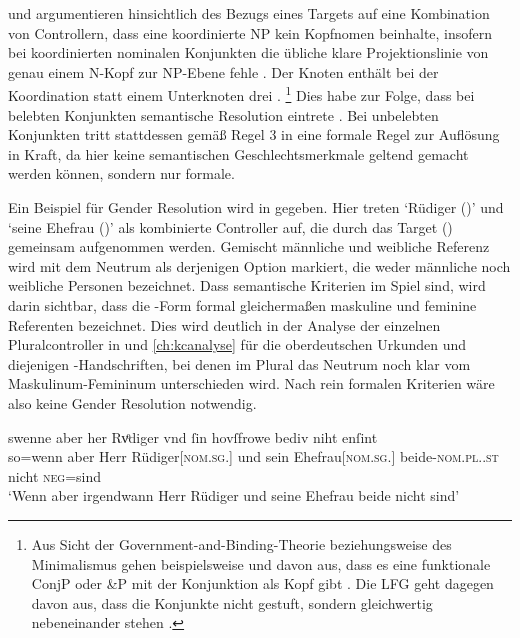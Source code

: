 \citet[182--183]{wechslerzlatic2003} und \citet[576]{wechsler2009}
argumentieren hinsichtlich des Bezugs eines Targets auf eine Kombination von
Controllern, dass eine koordinierte NP kein Kopf\-nomen beinhalte, insofern bei
koordinierten nominalen Konjunkten die übliche klare Projektionslinie von genau
einem N-Kopf zur NP-Ebene fehle \autocites[183,
Anm.~85]{wechslerzlatic2003}[585, Anm.~7]{wechsler2009}. Der Knoten 
enthält bei der Koordination statt einem Unterknoten drei .%
%
	\footnote{Aus Sicht der Government-and-Binding-Theorie beziehungsweise des
	Minimalismus gehen beispielsweise
	\textcites{johannessen1998}{johannessen2005} und \citet{shen2019} davon
	aus, dass es eine funktionale ConjP oder \&P mit der Konjunktion als Kopf
	gibt \autocite[dagegen aber][]{borsley2005}. Die LFG geht dagegen davon
	aus, dass die Konjunkte nicht gestuft, sondern gleichwertig nebeneinander
	stehen \autocites[vgl.~z.\,B.][]{peterson2004}{sadlernordlinger2006}.}
%
Dies habe zur Folge, dass bei belebten Konjunkten semantische Resolution
eintrete \autocites[183]{wechslerzlatic2003}[576]{wechsler2009}. Bei unbelebten
Konjunkten tritt stattdessen gemäß Regel 3 in  eine
formale Regel zur Auflösung in Kraft, da hier keine semantischen
Geschlechtsmerkmale geltend gemacht werden können, sondern nur formale.

Ein Beispiel für Gender Resolution wird in  gegeben. Hier
treten  `Rüdiger (\MascM)' und  `seine Ehefrau
(\FemF)' als kombinierte Controller auf, die durch das Target 
(\NeutMF) gemeinsam aufgenommen werden. Gemischt männliche und weibliche
Referenz wird mit dem Neutrum als derjenigen Option markiert, die weder
männliche noch weibliche Personen bezeichnet. Dass semantische Kriterien im
Spiel sind, wird darin sichtbar, dass die -Form formal gleichermaßen
maskuline und feminine Referenten bezeichnet. Dies wird deutlich in der Analyse
der einzelnen Pluralcontroller in  und
\ref{ch:kcanalyse} für die oberdeutschen Urkunden und diejenigen
\KC{}-Handschriften, bei denen im Plural das Neutrum noch klar vom
Maskulinum-Femininum unterschieden wird. Nach rein formalen Kriterien wäre also
keine Gender Resolution notwendig.

\begin{exe}
\ex \label{ex:gendres2}
		\gll swenne aber her Rvͦdiger vnd ſin
			hovſfrowe bediv niht enſint \\
		so=wenn aber Herr Rüdiger[\textsc{nom.sg.\MascM}] und sein
			Ehefrau[\textsc{nom.sg.\FemF}] beide-\textsc{nom.pl.\NeutMF.st}
			nicht \textsc{neg}=sind \\
		\trans `Wenn aber irgendwann Herr Rüdiger und seine Ehefrau
			beide nicht  sind'
			\parencites(Nr.~3262, Regensburg, 1299)[425,13--14]{cao4}
\end{exe}

